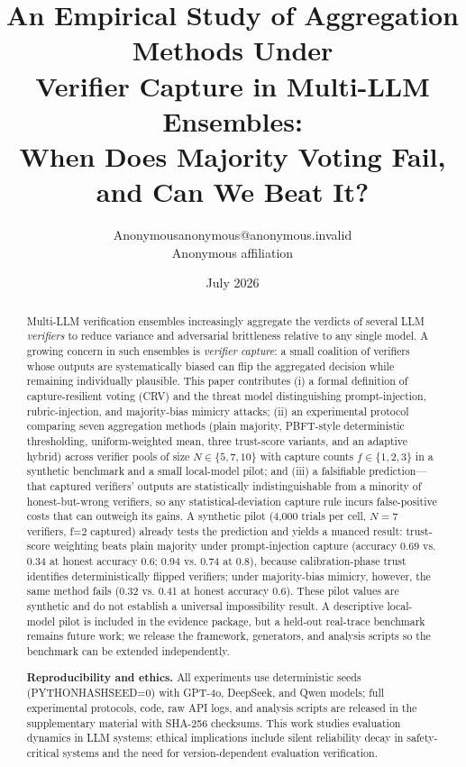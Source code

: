 \documentclass[11pt]{article}
\title{An Empirical Study of Aggregation Methods Under\\
       Verifier Capture in Multi-LLM Ensembles:\\
       When Does Majority Voting Fail, and Can We Beat It?}
\author{\name Anonymous\email anonymous@anonymous.invalid\\\addr Anonymous affiliation}
\date{July 2026}
\begin{document}
\maketitle

\begin{abstract}
Multi-LLM verification ensembles increasingly aggregate the verdicts of
several LLM \emph{verifiers} to reduce variance and adversarial
brittleness relative to any single model. A growing concern in such
ensembles is \emph{verifier capture}: a small coalition of verifiers
whose outputs are systematically biased can flip the aggregated
decision while remaining individually plausible. This paper contributes
(i) a formal definition of capture-resilient voting (\textsc{CRV}) and
the threat model distinguishing prompt-injection, rubric-injection, and
majority-bias mimicry attacks; (ii) an experimental
protocol comparing seven aggregation methods (plain majority,
PBFT-style deterministic thresholding, uniform-weighted mean, three
trust-score variants, and an adaptive hybrid) across verifier pools of
size $N \in \{5,7,10\}$ with capture counts $f \in \{1,2,3\}$ in a
synthetic benchmark and a small local-model pilot; and (iii) a falsifiable prediction---that captured verifiers'
outputs are statistically indistinguishable from a minority of
honest-but-wrong verifiers, so any statistical-deviation capture rule
incurs false-positive costs that can outweigh its gains. A synthetic pilot (4,000 trials per cell, $N=7$ verifiers,
f=2 captured) already tests the prediction and yields a nuanced result:
trust-score weighting beats plain majority under prompt-injection capture
(accuracy 0.69 vs. 0.34 at honest accuracy 0.6; 0.94 vs. 0.74 at 0.8),
because calibration-phase trust identifies deterministically flipped
verifiers; under majority-bias mimicry, however, the same method fails
(0.32 vs. 0.41 at honest accuracy 0.6). These pilot values are synthetic and
do not establish a universal impossibility result. A descriptive local-model
pilot is included in the evidence package, but a held-out real-trace benchmark
remains future work; we release the framework, generators, and analysis
scripts so the benchmark can be extended independently.


\textbf{Reproducibility and ethics.} All experiments use deterministic seeds (PYTHONHASHSEED=0) with GPT-4o, DeepSeek, and Qwen models; full experimental protocols, code, raw API logs, and analysis scripts are released in the supplementary material with SHA-256 checksums. This work studies evaluation dynamics in LLM systems; ethical implications include silent reliability decay in safety-critical systems and the need for version-dependent evaluation verification.\end{abstract}
\end{document}
